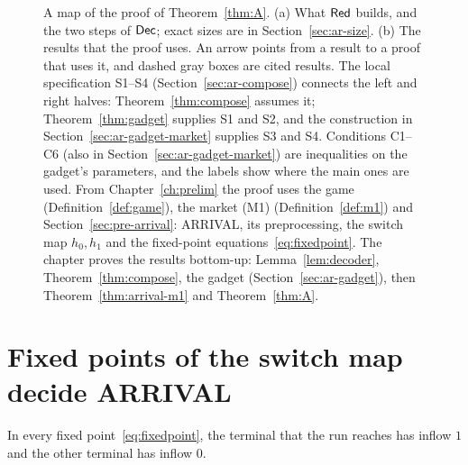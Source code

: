 \begin{figure}[p]
\caption{A map of the proof of Theorem~\ref{thm:A}. (a) What $\mathsf{Red}$ builds, and the two steps of $\mathsf{Dec}$;
exact sizes are in Section~\ref{sec:ar-size}. (b) The results that the proof uses. An arrow points from
a result to a proof that uses it, and dashed gray boxes are cited results. The local specification
S1--S4 (Section~\ref{sec:ar-compose}) connects the left and right halves: Theorem~\ref{thm:compose}
assumes it; Theorem~\ref{thm:gadget} supplies S1 and S2, and the construction in
Section~\ref{sec:ar-gadget-market} supplies S3 and S4. Conditions C1--C6 (also in
Section~\ref{sec:ar-gadget-market}) are inequalities on the gadget's parameters, and the labels show where the main ones are used. From Chapter~\ref{ch:prelim} the proof uses the game (Definition~\ref{def:game}),
the market (M1) (Definition~\ref{def:m1}) and Section~\ref{sec:pre-arrival}: ARRIVAL, its
preprocessing, the switch map $h_0,h_1$ and the fixed-point equations~\eqref{eq:fixedpoint}. The chapter proves the results
bottom-up: Lemma~\ref{lem:decoder}, Theorem~\ref{thm:compose}, the gadget
(Section~\ref{sec:ar-gadget}), then Theorem~\ref{thm:arrival-m1} and Theorem~\ref{thm:A}.}
\label{fig:ar-map}
\end{figure}


\section{Fixed points of the switch map decide ARRIVAL}

\begin{lemma}[Decoder]\label{lem:decoder}
\statusrefereed
In every fixed point~\eqref{eq:fixedpoint}, the terminal that the run reaches has inflow $1$ and the
other terminal has inflow $0$.
\end{lemma}

